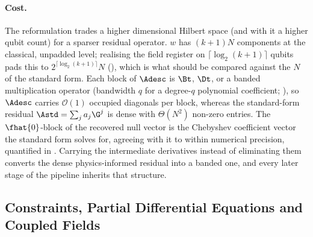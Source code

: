\paragraph{Cost.}
The reformulation trades a higher dimensional Hilbert space (and with it a higher qubit count) for a sparser residual operator. $w$ has $(k+1)N$ components at the classical, unpadded level; realising the field register on $\lceil\log_2(k+1)\rceil$ qubits pads this to $2^{\lceil\log_2(k+1)\rceil}N$ (), which is what should be compared against the $N$ of the standard form. Each block of $\Adesc$ is $\Bt$, $\Dt$, or a banded multiplication operator (bandwidth $q$ for a degree-$q$ polynomial coefficient; ), so $\Adesc$ carries $\mathcal{O}(1)$ occupied diagonals per block, whereas the standard-form residual $\Astd = \sum_j a_j \G^j$ is dense with $\Theta(N^2)$ non-zero entries. The $\fhat{0}$-block of the recovered null vector is the Chebyshev coefficient vector the standard form solves for, agreeing with it to within numerical precision, quantified in . Carrying the intermediate derivatives instead of eliminating them converts the dense physics-informed residual into a banded one, and every later stage of the pipeline inherits that structure.

\subsection{Constraints, Partial Differential Equations and Coupled Fields}
\label{sec:descriptor-constraints}

